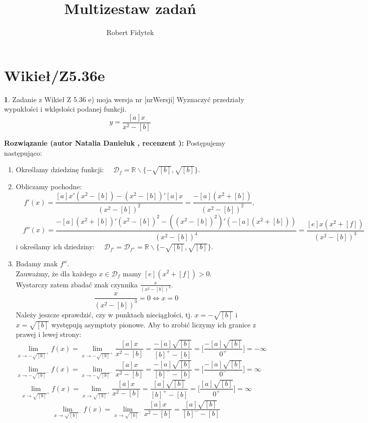 \documentclass[12pt, a4paper]{article}
\title{Multizestaw zadań}
\author{Robert Fidytek}
\date{}
\theoremstyle{definition} %
\newtheorem{zad}{}
\newcommand{\kategoria}[1]{\section{#1}} %
\newcommand{\zadStart}[1]{\begin{zad}#1\newline} %
\newcommand{\zadStop}{\end{zad}}   %
\newcommand{\rozwStart}[2]{\noindent \textbf{Rozwiązanie (autor #1 , recenzent #2): }\newline} %
\begin{document}
\maketitle

\kategoria{Wikieł/Z5.36e}

\zadStart{Zadanie z Wikieł Z 5.36 e) moja wersja nr [nrWersji]}
Wyznaczyć przedziały wypukłości i wklęsłości podanej funkcji.
$$y =\frac{[a]x}{x^2 - [b]}$$
\zadStop

\rozwStart{Natalia Danieluk}{}
Postępujemy następująco:
\begin{enumerate}
\item Określamy dziedzinę funkcji: $\quad \mathcal{D}_f=\mathbb{R} \backslash \{-\sqrt{[b]},\sqrt{[b]}\}$. \\
\item Obliczamy pochodne: 
$$\quad f'(x) = \frac{[a]x'(x^2 - [b]) - (x^2 - [b])'[a]x}{(x^2 - [b])^2} = \frac{-[a](x^2+[b])}{(x^2 - [b])^2},$$
$$\quad f''(x) = \frac{-[a](x^2+[b])'(x^2 - [b])^2 - ((x^2 - [b])^2)'(-[a](x^2+[b]))}{(x^2 - [b])^4} = \frac{[e]x(x^2+[f])}{(x^2 - [b])^3}$$
i określamy ich dziedziny: $\quad \mathcal{D}_{f'}=\mathcal{D}_{f''}=\mathbb{R} \backslash \{-\sqrt{[b]},\sqrt{[b]}\}$. \\
\item Badamy znak $f''$. \\
Zauważmy, że dla każdego $x \in \mathcal{D}_f$ mamy $[e](x^2+[f]) > 0$. \\
Wystarczy zatem zbadać znak czynnika $\frac{x}{(x^2 - [b])^3}$. \\
$$ \frac{x}{(x^2 - [b])^3} = 0 \Leftrightarrow x = 0 $$
Należy jeszcze sprawdzić, czy w punktach nieciągłości, tj. $x=-\sqrt{[b]}$ i $x=\sqrt{[b]}$ występują asymptoty pionowe. Aby to zrobić liczymy ich granice z prawej i lewej strony:
$$\lim_{x \rightarrow -\sqrt{[b]}^+} f(x) = \lim_{x \rightarrow -\sqrt{[b]}^+} \frac{[a]x}{x^2 - [b]} = \frac{-[a]\sqrt{[b]}}{[b]^{+} - [b]} 
= \Bigg[ \frac{-[a]\sqrt{[b]}}{0^{+}}\Bigg] = -\infty$$ 
$$\lim_{x \rightarrow -\sqrt{[b]}^-} f(x) = \lim_{x \rightarrow -\sqrt{[b]}^-} \frac{[a]x}{x^2 - [b]} = \frac{-[a]\sqrt{[b]}}{[b]^{-} - [b]} 
= \Bigg[ \frac{-[a]\sqrt{[b]}}{0^{-}}\Bigg] = \infty$$ 
$$\lim_{x \rightarrow \sqrt{[b]}^+} f(x) = \lim_{x \rightarrow \sqrt{[b]}^+} \frac{[a]x}{x^2 - [b]} = \frac{[a]\sqrt{[b]}}{[b]^{+} - [b]} 
= \Bigg[ \frac{[a]\sqrt{[b]}}{0^{+}}\Bigg] = \infty$$ 
$$\lim_{x \rightarrow \sqrt{[b]}^-} f(x) = \lim_{x \rightarrow \sqrt{[b]}^-} \frac{[a]x}{x^2 - [b]} = \frac{[a]\sqrt{[b]}}{[b]^{-} - [b]} 
$$
\end{enumerate}
\end{document}
